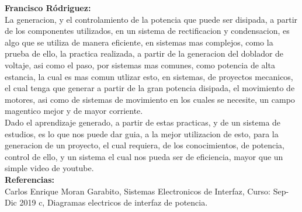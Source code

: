 \documentclass[12pt,a4paper]{article}
\begin{document}
\textbf{Francisco Ródriguez:}\\
La generacion, y el controlamiento de la potencia que puede ser disipada, a partir de los componentes utilizados, en un sistema de rectificacion y condensacion, es algo que se utiliza de manera eficiente, en sistemas mas complejos, como la prueba de ello, la practica realizada, a partir de la generacion del doblador de voltaje, asi como el paso, por sistemas mas comunes, como potencia de alta estancia, la cual es mas comun utlizar esto, en sistemas, de proyectos mecanicos, el cual tenga que generar a partir de la gran potencia disipada, el movimiento de motores, asi como de sistemas de movimiento en los cuales se necesite, un campo magentico mejor y de mayor corriente.\\
Dado el aprendizaje generado, a partir de estas practicas, y de un sistema de estudios, es lo que nos puede dar guia, a la mejor utilizacion de esto, para la generacion de un proyecto, el cual requiera, de los conocimientos, de potencia, control de ello, y un sistema el cual nos pueda ser de eficiencia, mayor que un simple video de youtube.\\

\textbf{\Large Referencias:}\\

Carlos Enrique Moran Garabito, Sistemas Electronicos de Interfaz, Curso: Sep-Dic 2019 c, Diagramas electricos de interfaz de potencia.
\end{document}
